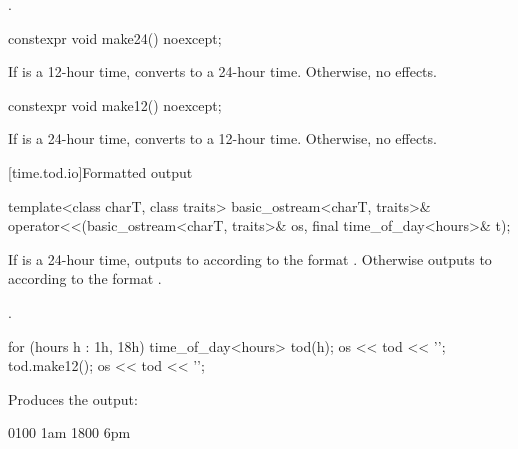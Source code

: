 \begin{itemdescr}
\pnum
\returns {}.
\end{itemdescr}

%
\begin{itemdecl}
constexpr void make24() noexcept;
\end{itemdecl}

\begin{itemdescr}
\pnum
\effects
If  is a 12-hour time,
converts to a 24-hour time.
Otherwise, no effects.
\end{itemdescr}

%
\begin{itemdecl}
constexpr void make12() noexcept;
\end{itemdecl}

\begin{itemdescr}
\pnum
\effects
If  is a 24-hour time,
converts to a 12-hour time.
Otherwise, no effects.
\end{itemdescr}

[time.tod.io]{Formatted output}

%
\begin{itemdecl}
template<class charT, class traits>
  basic_ostream<charT, traits>&
    operator<<(basic_ostream<charT, traits>& os, final time_of_day<hours>& t);
\end{itemdecl}

\begin{itemdescr}
\pnum
\effects
If  is a 24-hour time,
outputs to  according to the format
.
Otherwise
outputs to  according to the format
.

\pnum
\returns {}.

\pnum
\begin{example}
\begin{codeblock}
for (hours h : {1h, 18h}) {
  time_of_day<hours> tod(h);
  os << tod << '\n';
  tod.make12();
  os << tod << '\n';
}
\end{codeblock}

Produces the output:

\begin{codeblock}
0100
1am
1800
6pm
\end{codeblock}
\end{example}
\end{itemdescr}

